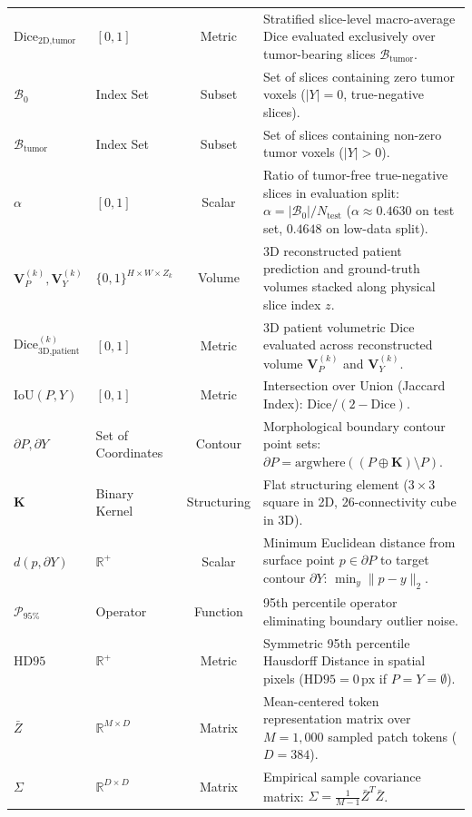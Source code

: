 \documentclass{article}
\begin{document}
\begin{table}[ht]
{\begin{tabular}{llcp{8.6cm}}
$\text{Dice}_{\text{2D,tumor}}$ & $[0, 1]$ & Metric & Stratified slice-level macro-average Dice evaluated exclusively over tumor-bearing slices $\mathcal{B}_{\text{tumor}}$. \\
$\mathcal{B}_0$ & Index Set & Subset & Set of slices containing zero tumor voxels ($|Y| = 0$, true-negative slices). \\
$\mathcal{B}_{\text{tumor}}$ & Index Set & Subset & Set of slices containing non-zero tumor voxels ($|Y| > 0$). \\
$\alpha$ & $[0, 1]$ & Scalar & Ratio of tumor-free true-negative slices in evaluation split: $\alpha = |\mathcal{B}_0| / N_{\text{test}}$ ($\alpha \approx 0.4630$ on test set, $0.4648$ on low-data split). \\
$\mathbf{V}_P^{(k)}, \mathbf{V}_Y^{(k)}$ & $\{0, 1\}^{H \times W \times Z_k}$ & Volume & 3D reconstructed patient prediction and ground-truth volumes stacked along physical slice index $z$. \\
$\text{Dice}_{\text{3D,patient}}^{(k)}$ & $[0, 1]$ & Metric & 3D patient volumetric Dice evaluated across reconstructed volume $\mathbf{V}_P^{(k)}$ and $\mathbf{V}_Y^{(k)}$. \\
$\text{IoU}(P, Y)$ & $[0, 1]$ & Metric & Intersection over Union (Jaccard Index): $\text{Dice} / (2 - \text{Dice})$. \\
$\partial P, \partial Y$ & Set of Coordinates & Contour & Morphological boundary contour point sets: $\partial P = \text{argwhere}((P \oplus \mathbf{K}) \setminus P)$. \\
$\mathbf{K}$ & Binary Kernel & Structuring & Flat structuring element ($3 \times 3$ square in 2D, 26-connectivity cube in 3D). \\
$d(p, \partial Y)$ & $\mathbb{R}^+$ & Scalar & Minimum Euclidean distance from surface point $p \in \partial P$ to target contour $\partial Y$: $\min_{y} \|p - y\|_2$. \\
$\mathcal{P}_{\text{95\%}}$ & Operator & Function & 95th percentile operator eliminating boundary outlier noise. \\
$\text{HD95}$ & $\mathbb{R}^+$ & Metric & Symmetric 95th percentile Hausdorff Distance in spatial pixels ($\text{HD95} = 0\,\text{px}$ if $P=Y=\emptyset$). \\
$\bar{Z}$ & $\mathbb{R}^{M \times D}$ & Matrix & Mean-centered token representation matrix over $M = 1,000$ sampled patch tokens ($D = 384$). \\
$\Sigma$ & $\mathbb{R}^{D \times D}$ & Matrix & Empirical sample covariance matrix: $\Sigma = \frac{1}{M-1} \bar{Z}^T \bar{Z}$. \\

\end{tabular}}
\end{table}
\end{document}

